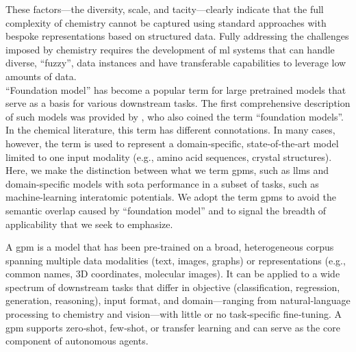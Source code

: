 These factors---the diversity, scale, and tacity---clearly indicate that the full complexity of chemistry cannot be captured using standard approaches with bespoke representations based on structured data.\autocite{jablonka2022making}
Fully addressing the challenges imposed by chemistry requires the development of \gls{ml} systems that can handle diverse, \enquote{fuzzy}, data instances and have transferable capabilities to leverage low amounts of data. \\


\enquote{Foundation model} has become a popular term for large pretrained models that serve as a basis for various downstream tasks. The first comprehensive description of such models was provided by \textcite{bommasani2021opportunities}, who also coined the term \enquote{foundation models}. 
In the chemical literature, this term has different connotations. In many cases, however, the term is used to represent a domain‑specific, state‑of‑the‑art model limited to one input modality (e.g., amino acid sequences, crystal structures). 
Here, we make the distinction between what we term \glspl{gpm}, such as \glspl{llm} \autocite{zhang2024chemllm, guo2025deepseek, openai2023gpt04, anthropic2025system, brown2020language} and domain-specific models with \gls{sota} performance in a subset of tasks, such as machine-learning interatomic potentials.\autocite{batatia2023foundation,Chen_2022,unke2021machine} We adopt the term \glspl{gpm} to avoid the semantic overlap caused by \enquote{foundation model} and to signal the breadth of applicability that we seek to emphasize.

A \gls{gpm} is a model that has been pre‑trained on a broad, heterogeneous corpus spanning multiple data modalities (text, images, graphs) or representations (e.g., common names, 3D coordinates, molecular images).
It can be applied to a wide spectrum of downstream tasks that differ in objective (classification, regression, generation, reasoning), input format, and domain---ranging from natural‑language processing to chemistry and vision---with little or no task‑specific fine‑tuning.
A \gls{gpm} supports zero‑shot, few‑shot, or transfer learning and can serve as the core component of autonomous agents.


